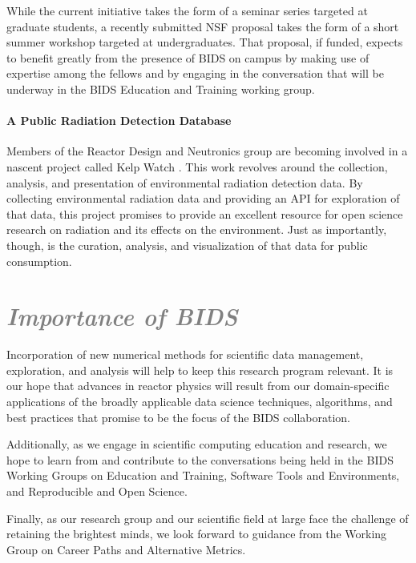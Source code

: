\documentclass[a4paper, 10pt]{article}
\begin{document}
While the current initiative takes the form of a seminar series targeted at 
graduate students, a recently submitted NSF proposal takes the form of a
short summer workshop targeted at undergraduates. That proposal, if funded, expects to 
benefit greatly from the presence of BIDS on campus by making use of expertise 
among the fellows and by engaging in the conversation that will be underway in 
the BIDS Education and Training working group.  


\paragraph{A Public Radiation Detection Database}

Members of the Reactor Design and Neutronics group are becoming involved in a 
nascent project called Kelp Watch \cite{vetter_about_2014}. This work revolves 
around the collection, analysis, and presentation of environmental radiation 
detection data. By collecting environmental radiation data and providing an API 
for exploration of that data, this project promises to provide an excellent 
resource for open science research on radiation and its effects on the 
environment. Just as importantly, though, is the curation, analysis, and 
visualization of that data for public consumption. 

\section*{\textcolor{gray}{\it Importance of BIDS}}

Incorporation of new numerical methods for scientific data management, 
exploration, and analysis will help to keep this research program relevant. 
It is our hope that advances in reactor physics will result from our 
domain-specific applications of the broadly applicable data science techniques, 
algorithms, and best practices that promise to be the focus of the BIDS 
collaboration.

Additionally, as we engage in scientific computing education and research, we 
hope to learn from and contribute to the conversations being held in the BIDS 
Working Groups on Education and Training, Software Tools and Environments, and 
Reproducible and Open Science.  

Finally, as our research group and our scientific field at large face the 
challenge of retaining the brightest minds, we look forward to guidance from the 
Working Group on Career Paths and Alternative Metrics.



\end{document}
